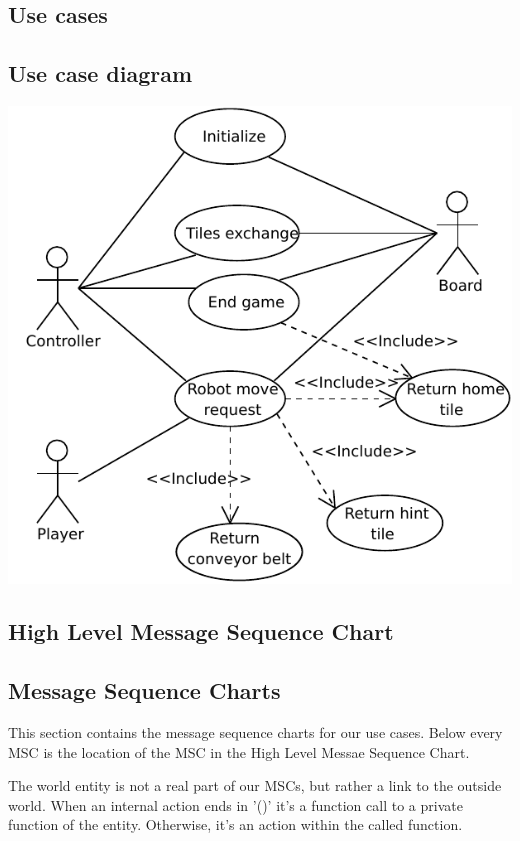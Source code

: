 \subsection{Use cases}
	
\subsection{Use case diagram}
	\includegraphics[width=\linewidth]{usecases/diagram.pdf}	

\subsection{High Level Message Sequence Chart}
	
	
	
\subsection{Message Sequence Charts}
	This section contains the message sequence charts for our use cases. Below every MSC is the location of the MSC in the High Level Messae Sequence Chart.

	The world entity is not a real part of our MSCs, but rather a link to the outside world. When an internal action ends in '()' it's a function call to a private function of the entity. Otherwise, it's an action within the called function.

